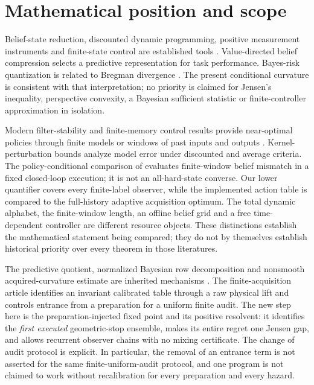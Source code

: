 \section{Mathematical position and scope}\label{sec:comparison}
Belief-state reduction, discounted dynamic programming, positive measurement instruments and finite-state control are established tools \cite{DL1970,BMT2001,YB2008}. Value-directed belief compression \cite{PB2002} selects a predictive representation for task performance. Bayes-risk quantization is related to Bregman divergence \cite{Varshney2011}. The present conditional curvature is consistent with that interpretation; no priority is claimed for Jensen's inequality, perspective convexity, a Bayesian sufficient statistic or finite-controller approximation in isolation.

Modern filter-stability and finite-memory control results provide near-optimal policies through finite models or windows of past inputs and outputs \cite{KY2022,DKY2024}. Kernel-perturbation bounds \cite{DKY2025} analyze model error under discounted and average criteria. The policy-conditional comparison of \cite{Kim2026} evaluates finite-window belief mismatch in a fixed closed-loop execution; it is not an all-hard-state converse. Our lower quantifier covers every finite-label observer, while the implemented action table is compared to the full-history adaptive acquisition optimum. The total dynamic alphabet, the finite-window length, an offline belief grid and a free time-dependent controller are different resource objects. These distinctions establish the mathematical statement being compared; they do not by themselves establish historical priority over every theorem in those literatures.

The predictive quotient, normalized Bayesian row decomposition and nonsmooth acquired-curvature estimate are inherited mechanisms \cite{GTFBayesian,GTFControlled}. The finite-acquisition article \cite{GTFFinite} identifies an invariant calibrated table through a raw physical lift and controls entrance from a preparation for a uniform finite audit. The new step here is the preparation-injected fixed point and its positive resolvent: it identifies the \emph{first executed} geometric-stop ensemble, makes its entire regret one Jensen gap, and allows recurrent observer chains with no mixing certificate. The change of audit protocol is explicit. In particular, the removal of an entrance term is not asserted for the same finite-uniform-audit protocol, and one program is not claimed to work without recalibration for every preparation and every hazard.


